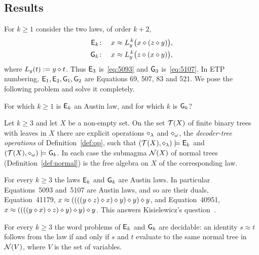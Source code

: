\subsection{Results}
For $k\ge1$ consider the two laws, of order $k+2$,
\begin{align}
  \mathsf{E}_{k}\colon&\quad x \approx L_y^{\,k}\bigl(x \mathbin{\diamond} (z\mathbin{\diamond} y)\bigr), \label{eq:Ek}\\
  \mathsf{G}_{k}\colon&\quad x \approx L_y^{\,k}\bigl(z \mathbin{\diamond} (x\mathbin{\diamond} y)\bigr), \label{eq:Gk}
\end{align}
where $L_y(t):=y\mathbin{\diamond} t$. Thus $\mathsf{E}_{3}$ is~\eqref{eq:5093} and $\mathsf{G}_{3}$
is~\eqref{eq:5107}. In ETP numbering, $\mathsf{E}_{1},\mathsf{E}_{2},\mathsf{G}_{1},\mathsf{G}_{2}$ are Equations
69, 507, 83 and 521. We pose the following problem and solve it completely.

\begin{question}\label{q:class}
For which $k\ge1$ is $\mathsf{E}_{k}$ an Austin law, and for which $k$ is $\mathsf{G}_{k}$?
\end{question}

\begin{theorem}\label{thm:main}
Let $k\ge 3$ and let $X$ be a non-empty set. On the set $\mathcal{T}(X)$ of finite binary
trees with leaves in $X$ there are explicit operations $\mathbin{\diamond}_\lambda$ and
$\mathbin{\diamond}_\omega$, the \emph{decoder-tree operations} of Definition~\ref{def:op},
such that $(\mathcal{T}(X),\mathbin{\diamond}_\lambda)\models\mathsf{E}_{k}$ and
$(\mathcal{T}(X),\mathbin{\diamond}_\omega)\models\mathsf{G}_{k}$. In each case the submagma $\mathcal{N}(X)$ of normal
trees (Definition~\ref{def:normal}) is the free algebra on $X$ of the
corresponding law.
\end{theorem}

\begin{corollary}\label{cor:austin}
For every $k\ge 3$ the laws $\mathsf{E}_{k}$ and $\mathsf{G}_{k}$ are Austin laws. In particular
Equations~5093 and~5107 are Austin laws, and so are their duals,
Equation~41179, $x\approx((((y\mathbin{\diamond} z)\mathbin{\diamond} x)\mathbin{\diamond} y)\mathbin{\diamond} y)\mathbin{\diamond} y$, and
Equation~40951, $x\approx((((y\mathbin{\diamond} x)\mathbin{\diamond} z)\mathbin{\diamond} y)\mathbin{\diamond} y)\mathbin{\diamond} y$. This answers
Kisielewicz's question~\cite{Kisielewicz1997,ETP2025}.
\end{corollary}

\begin{corollary}\label{cor:wp}
For every $k\ge3$ the word problems of $\mathsf{E}_{k}$ and $\mathsf{G}_{k}$ are decidable: an
identity $s\approx t$ follows from the law if and only if $s$ and $t$ evaluate
to the same normal tree in $\mathcal{N}(V)$, where $V$ is the set of variables.
\end{corollary}

